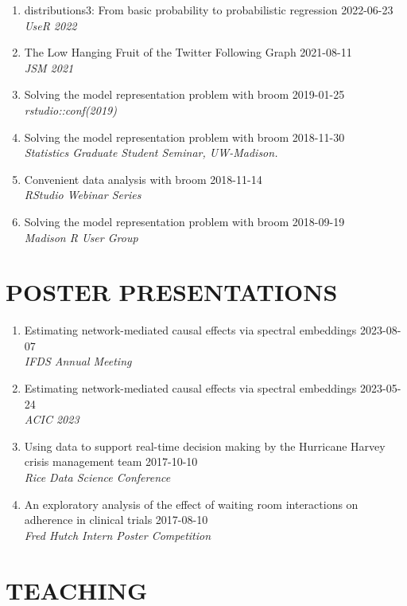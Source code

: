 \documentclass[11pt]{article}
\begin{document}
\begin{enumerate}
    \item distributions3: From basic probability to probabilistic regression \hfill 2022-06-23 \\ \emph{\small UseR 2022}
    \item The Low Hanging Fruit of the Twitter Following Graph \hfill 2021-08-11 \\ \emph{\small JSM 2021}
    \item Solving the model representation problem with broom \hfill 2019-01-25 \\ \emph{\small rstudio::conf(2019)}
    \item Solving the model representation problem with broom \hfill 2018-11-30 \\ \emph{\small Statistics Graduate Student Seminar, UW-Madison.}
    \item Convenient data analysis with broom \hfill 2018-11-14 \\ \emph{\small RStudio Webinar Series}
    \item Solving the model representation problem with broom \hfill 2018-09-19 \\ \emph{\small Madison R User Group}
\end{enumerate}

\section*{POSTER PRESENTATIONS}

\begin{enumerate}
    \item Estimating network-mediated causal effects via spectral embeddings  \hfill 2023-08-07 \\ \emph{IFDS Annual Meeting}
    \item Estimating network-mediated causal effects via spectral embeddings \hfill 2023-05-24 \\ \emph{ACIC 2023}
    \item Using data to support real-time decision making by the Hurricane Harvey crisis management team \hfill 2017-10-10 \\ \emph{Rice Data Science Conference}
    \item An exploratory analysis of the effect of waiting room interactions on adherence in clinical trials \hfill 2017-08-10 \\ \emph{Fred Hutch Intern Poster Competition}
\end{enumerate}

\section*{TEACHING}
\end{document}
